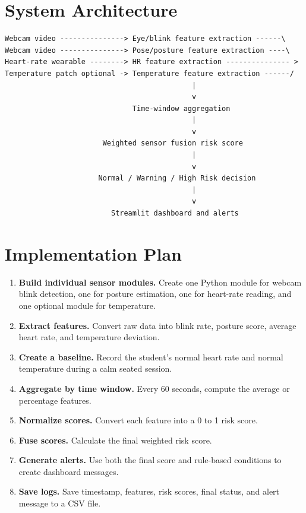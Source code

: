 \documentclass[11pt,a4paper]{article}
\begin{document}
\section{System Architecture}

\begin{verbatim}
Webcam video ---------------> Eye/blink feature extraction ------\
Webcam video ---------------> Pose/posture feature extraction ----\
Heart-rate wearable --------> HR feature extraction --------------- >
Temperature patch optional -> Temperature feature extraction ------/
                                            |
                                            v
                              Time-window aggregation
                                            |
                                            v
                       Weighted sensor fusion risk score
                                            |
                                            v
                      Normal / Warning / High Risk decision
                                            |
                                            v
                         Streamlit dashboard and alerts
\end{verbatim}

\section{Implementation Plan}

\begin{enumerate}[leftmargin=*]
    \item \textbf{Build individual sensor modules.} Create one Python module for webcam blink detection, one for posture estimation, one for heart-rate reading, and one optional module for temperature.
    \item \textbf{Extract features.} Convert raw data into blink rate, posture score, average heart rate, and temperature deviation.
    \item \textbf{Create a baseline.} Record the student's normal heart rate and normal temperature during a calm seated session.
    \item \textbf{Aggregate by time window.} Every 60 seconds, compute the average or percentage features.
    \item \textbf{Normalize scores.} Convert each feature into a 0 to 1 risk score.
    \item \textbf{Fuse scores.} Calculate the final weighted risk score.
    \item \textbf{Generate alerts.} Use both the final score and rule-based conditions to create dashboard messages.
    \item \textbf{Save logs.} Save timestamp, features, risk scores, final status, and alert message to a CSV file.
\end{enumerate}
\end{document}
